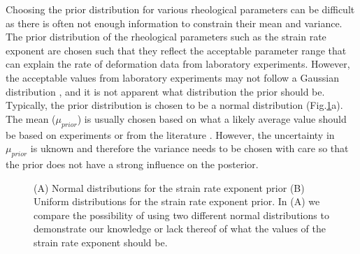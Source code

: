 \documentclass[12pt]{article}
\begin{document}
Choosing the prior distribution for various rheological parameters can be difficult as there is often not enough information to constrain their mean and variance. The prior distribution of the rheological parameters such as the strain rate exponent are chosen such that they reflect the acceptable parameter range that can explain the rate of deformation data from laboratory experiments. However, the acceptable values from laboratory experiments may not follow a Gaussian distribution \citep{korenaga2008new}, 
and it is not apparent what distribution the prior should be.  Typically, the prior distribution is chosen to be a normal distribution (Fig.\ref{fig:prior_ex}a).
The mean ($\mu_{prior}$) is usually chosen based on what a likely average value should be based on experiments or from  the literature \citep{korenaga2008new}. However, the uncertainty in $\mu_{prior}$ is uknown and therefore the variance needs to be chosen with care so that the prior does not have a strong influence on the posterior.    %
\begin{figure}[H]
\centering
\hspace{-1.2cm}
\hspace{-0.2cm}

\caption{(A) Normal distributions for the strain rate exponent prior (B) Uniform distributions for the strain rate exponent prior. In (A) we compare the possibility of using two different normal distributions to demonstrate our knowledge or lack thereof of what the values of the strain rate exponent should be. }
\label{fig:prior_ex} 
\end{figure}
\end{document}
